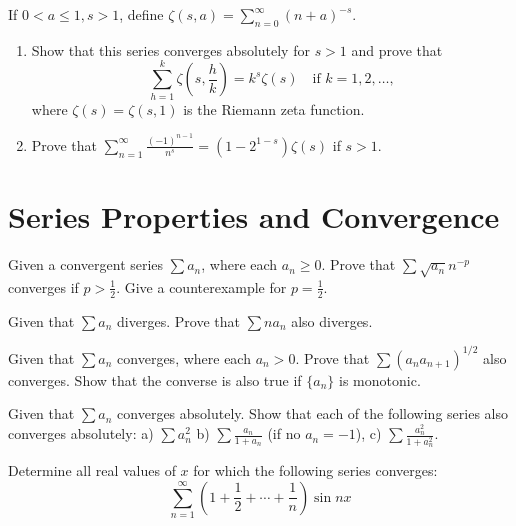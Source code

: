 \begin{problembox}
If \(0 < a \leq 1, s > 1\), define \(\zeta(s, a) = \sum_{n=0}^{\infty} (n + a)^{-s}\).
\begin{enumerate}[label=\alph*)]
\item Show that this series converges absolutely for \(s > 1\) and prove that
\[\sum_{h=1}^{k} \zeta \left( s, \frac{h}{k} \right) = k^s \zeta(s) \quad \text{if } k = 1, 2, \ldots,\]
where \(\zeta(s) = \zeta(s, 1)\) is the Riemann zeta function.
\item Prove that \(\sum_{n=1}^{\infty} \frac{(-1)^{n-1}}{n^s} = (1 - 2^{1-s}) \zeta(s)\) if \(s > 1\).
\end{enumerate}
\end{problembox}

\section{Series Properties and Convergence}

\begin{problembox}
Given a convergent series \(\sum a_n\), where each \(a_n \geq 0\). Prove that \(\sum \sqrt{a_n} n^{-p}\) converges if \(p > \frac{1}{2}\). Give a counterexample for \(p = \frac{1}{2}\).
\end{problembox}

\begin{problembox}
Given that \(\sum a_n\) diverges. Prove that \(\sum n a_n\) also diverges.
\end{problembox}

\begin{problembox}
Given that \(\sum a_n\) converges, where each \(a_n > 0\). Prove that \(\sum (a_n a_{n+1})^{1/2}\) also converges. Show that the converse is also true if \(\{a_n\}\) is monotonic.
\end{problembox}

\begin{problembox}
Given that \(\sum a_n\) converges absolutely. Show that each of the following series also converges absolutely:
a) \(\sum a_n^2\) b) \(\sum \frac{a_n}{1 + a_n}\) (if no \(a_n = -1\)),
c) \(\sum \frac{a_n^2}{1 + a_n^2}\).
\end{problembox}

\begin{problembox}
Determine all real values of \(x\) for which the following series converges:
\[\sum_{n=1}^{\infty} \left( 1 + \frac{1}{2} + \cdots + \frac{1}{n} \right) \sin nx\]
\end{problembox}

